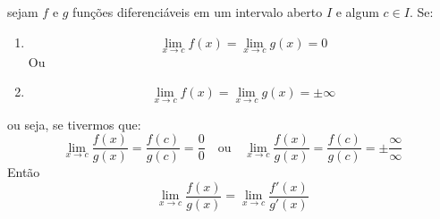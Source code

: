 sejam \(f\) e \(g\) funções diferenciáveis em um intervalo aberto \(I\) e algum \(c \in I\). Se:
\begin{enumerate}
    \item{ 
        \[
            \lim_{x \to c} f(x) = \lim_{x \to c} g(x)  = 0 
        \]
    }
    Ou
    \item{ 
        \[
            \lim_{x \to c} f(x) = \lim_{x \to c} g(x)  = \pm \infty 
        \]
    }
\end{enumerate}
ou seja, se tivermos que:
\begin{equation*}
    \lim_{x \to c} \frac{f(x)}{g(x)} = \frac{f(c)}{g(c)} = \frac{0}{0} 
    \quad \text{ou} \quad
    \lim_{x \to c} \frac{f(x)}{g(x)} = \frac{f(c)}{g(c)} = \pm \frac{\infty}{\infty}
\end{equation*}
Então
\begin{equation}
    \lim_{x \to c} \frac{f(x)}{g(x)} = 
    \lim_{x \to c} \frac{f'(x)}{g'(x)} 
\end{equation}